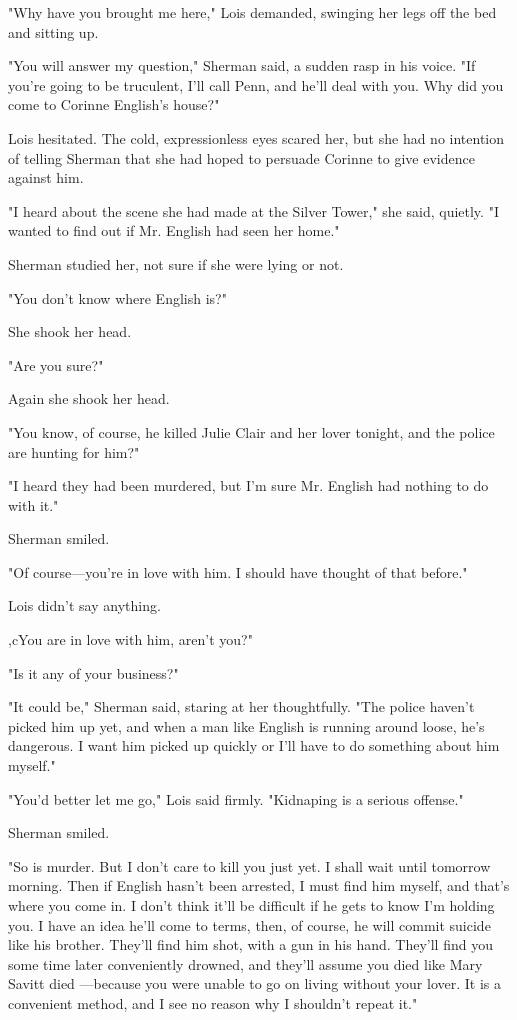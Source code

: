 \documentclass{novel}
\begin{document}
"Why have you brought me here," Lois demanded, swinging her legs off the bed and sitting up.

"You will answer my question," Sherman said, a sudden rasp in his voice. "If you're going to be truculent, I'll call Penn, and he'll deal with you. Why did you come to Corinne English's house?"

Lois hesitated. The cold, expressionless eyes scared her, but she had no intention of telling Sherman that she had hoped to persuade Corinne to give evidence against him.

"I heard about the scene she had made at the Silver Tower," she said, quietly. "I wanted to find out if Mr. English had seen her home."

Sherman studied her, not sure if she were lying or not.

"You don't know where English is?"

She shook her head.

"Are you sure?"

Again she shook her head.

"You know, of course, he killed Julie Clair and her lover tonight, and the police are hunting for him?"

"I heard they had been murdered, but I'm sure Mr. English had nothing to do with it."

Sherman smiled.

"Of course—you're in love with him. I should have thought of that before."

Lois didn't say anything.

,cYou are in love with him, aren't you?"

"Is it any of your business?"

"It could be," Sherman said, staring at her thoughtfully. "The police haven't picked him up yet, and when a man like English is running around loose, he's dangerous. I want him picked up quickly or I'll have to do something about him myself."

"You'd better let me go," Lois said firmly. "Kidnaping is a serious offense."

Sherman smiled.

"So is murder. But I don't care to kill you just yet. I shall wait until tomorrow morning. Then if English hasn't been arrested, I must find him myself, and that's where you come in. I don't think it'll be difficult if he gets to know I'm holding you. I have an idea he'll come to terms, then, of course, he will commit suicide like his brother. They'll find him shot, with a gun in his hand. They'll find you some time later conveniently drowned, and they'll assume you died like Mary Savitt died —because you were unable to go on living without your lover. It is a convenient method, and I see no reason why I shouldn't repeat it."
\end{document}
